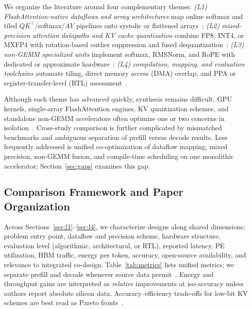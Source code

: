\documentclass[conference]{IEEEtran}
\begin{document}
We organize the literature around four complementary themes:
\emph{(L1) FlashAttention-native dataflows and array architectures} map online softmax and tiled $QK^\top$/softmax/$AV$ pipelines onto systolic or flattened arrays~\cite{lin2025systolicattention,plena2025,flatattention2026,wang2023cosa,streamattention2025,desa2025};
\emph{(L2) mixed-precision attention datapaths and KV cache quantization} combine FP8, INT4, or MXFP4 with rotation-based outlier suppression and fused dequantization~\cite{xiao2023smoothquant,ashkboos2024quarot,liu2024kivi,sawint42026,bitdecoding2026,batquant2026,ultraquant2026};
\emph{(L3) non-GEMM specialized units} implement softmax, RMSNorm, and RoPE with dedicated or approximate hardware~\cite{mive2026,sole2025,sun2022softmax,koca2023exp};
\emph{(L4) compilation, mapping, and evaluation toolchains} automate tiling, direct memory access (DMA) overlap, and PPA or register-transfer-level (RTL) assessment~\cite{parashar2019timeloop,wu2019accelergy,scalesimv3_2025,klhufek2025transinfersim,tilelang2025,plena2025}.

Although each theme has advanced quickly, synthesis remains difficult.
GPU kernels, single-array FlashAttention engines, KV quantization schemes, and standalone non-GEMM accelerators often optimize one or two concerns in isolation~\cite{lin2025systolicattention,liu2024kivi,mive2026,plena2025}.
Cross-study comparison is further complicated by mismatched benchmarks and ambiguous separation of prefill versus decode results.
Less frequently addressed is unified co-optimization of dataflow mapping, mixed precision, non-GEMM fusion, and compile-time scheduling on one monolithic accelerator; Section~\ref{sec:gaps} examines this gap.

\subsection{Comparison Framework and Paper Organization}
\label{sec:intro-metrics}

Across Sections~\ref{sec:l1}--\ref{sec:l4}, we characterize designs along shared dimensions: problem entry point, dataflow and precision scheme, hardware structure, evaluation level (algorithmic, architectural, or RTL), reported latency, PE utilization, HBM traffic, energy per token, accuracy, open-source availability, and relevance to integrated co-design.
Table~\ref{tab:metrics} lists unified metrics; we separate prefill and decode whenever source data permit~\cite{dao2023flashdecoding,bitdecoding2026}.
Energy and throughput gains are interpreted as \emph{relative} improvements at iso-accuracy unless authors report absolute silicon data.
Accuracy--efficiency trade-offs for low-bit KV schemes are best read as Pareto fronts~\cite{sawint42026,batquant2026}.
\end{document}
